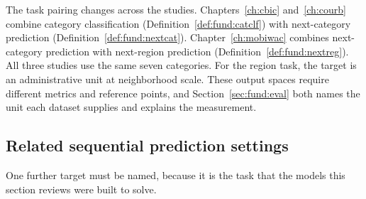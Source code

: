 The task pairing changes across the studies. Chapters~\ref{ch:cbic}
and~\ref{ch:courb} combine category classification
(Definition~\ref{def:fund:catclf}) with next-category prediction
(Definition~\ref{def:fund:nextcat}). Chapter~\ref{ch:mobiwac} combines next-category
prediction with next-region prediction (Definition~\ref{def:fund:nextreg}). All three
studies use the same seven categories. For the region task, the target is an administrative unit at
neighborhood scale. These output spaces require different metrics and reference points,
and Section~\ref{sec:fund:eval} both names the unit each dataset supplies and explains
the measurement.

\subsection{Related sequential prediction settings}

One further target must be named, because it is the task that the models this section
reviews were built to solve.


